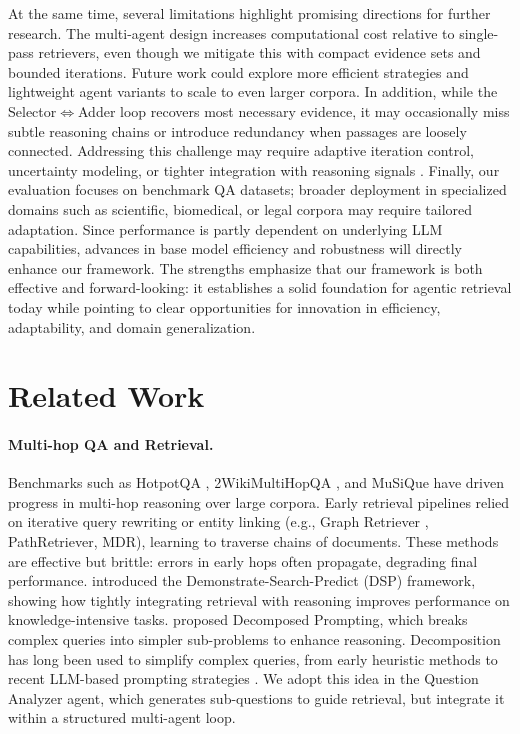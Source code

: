 \documentclass{article} %
\begin{document}
At the same time, several limitations highlight promising directions for further research. The multi-agent design increases computational cost relative to single-pass retrievers, even though we mitigate this with compact evidence sets and bounded iterations. Future work could explore  more efficient strategies and lightweight agent variants  to scale to even larger corpora. In addition, while the Selector$\Leftrightarrow$Adder loop recovers most necessary evidence, it may occasionally miss subtle reasoning chains or introduce redundancy when passages are loosely connected. Addressing this challenge may require  adaptive iteration control, uncertainty modeling, or tighter integration with reasoning signals . Finally, our evaluation focuses on benchmark QA datasets; broader deployment in specialized domains such as scientific, biomedical, or legal corpora may require tailored adaptation. Since performance is partly dependent on underlying LLM capabilities, advances in base model efficiency and robustness will directly enhance our framework. The strengths emphasize that our framework is both  effective and forward-looking: it establishes a solid foundation for agentic retrieval today while pointing to clear opportunities for innovation in  efficiency, adaptability, and domain generalization.

\section{Related Work}
\label{rel-work}

\paragraph{Multi-hop QA and Retrieval.} Benchmarks such as HotpotQA \citep{yang2018hotpotqa}, 2WikiMultiHopQA \citep{ho2020constructing}, and MuSiQue \citep{trivedi2022musique} have driven progress in multi-hop reasoning over large corpora. Early retrieval pipelines relied on iterative query rewriting or entity linking (e.g., Graph Retriever \citep{asai2020learning}, PathRetriever, MDR), learning to traverse chains of documents. These methods are effective but brittle: errors in early hops often propagate, degrading final performance. \citet{khattab2022demonstrate} introduced the Demonstrate-Search-Predict (DSP) framework, showing how tightly integrating retrieval with reasoning improves performance on knowledge-intensive tasks. \citet{khotdecomposed} proposed Decomposed Prompting, which breaks complex queries into simpler sub-problems to enhance reasoning. Decomposition has long been used to simplify complex queries, from early heuristic methods \citep{talmor2018web, min2019multi} to recent LLM-based prompting strategies \citep{khotdecomposed, fu-etal-2021-decomposing-complex}. We adopt this idea in the Question Analyzer agent, which generates sub-questions to guide retrieval, but integrate it within a structured multi-agent loop.
\end{document}
